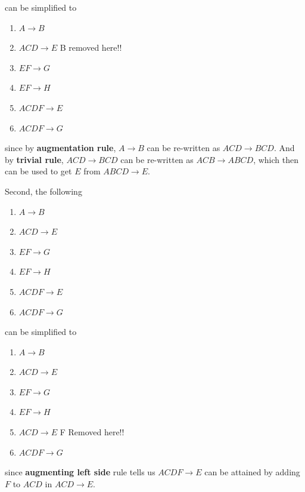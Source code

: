 \documentclass[12pt]{article}
\begin{document}
\begin{enumerate}[1.]
\begin{itemize}
            can be simplified to

            \begin{enumerate}[1.]
                \item $A \to B$
                \item $ACD \to E$ \color{red}B removed here!!\color{black}
                \item $EF \to G$
                \item $EF \to H$
                \item $ACDF \to E$
                \item $ACDF \to G$
            \end{enumerate}

            since by \textbf{augmentation rule}, $A \to B$ can be re-written as
            $ACD \to BCD$. And by \textbf{trivial rule}, $ACD \to BCD$ can be re-written
            as $ACB \to ABCD$, which then can be used to get $E$ from $ABCD \to E$.

            \bigskip

            Second, the following

            \begin{enumerate}[1.]
                \item $A \to B$
                \item $ACD \to E$
                \item $EF \to G$
                \item $EF \to H$
                \item $ACDF \to E$
                \item $ACDF \to G$
            \end{enumerate}

            can be simplified to

            \begin{enumerate}[1.]
                \item $A \to B$
                \item $ACD \to E$
                \item $EF \to G$
                \item $EF \to H$
                \item $ACD \to E$ \color{red}F Removed here!!\color{black}
                \item $ACDF \to G$
            \end{enumerate}

            since \textbf{augmenting left side} rule tells us
            $ACDF \to E$ can be attained by adding $F$ to $ACD$ in $ACD \to E$.


\end{itemize}
\end{enumerate}
\end{document}
